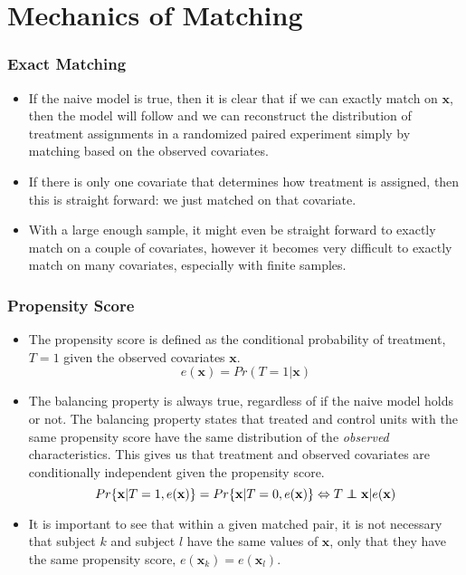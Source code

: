 \documentclass{beamer}
\newcommand\independent{\protect\mathpalette{\protect\independenT}{\perp}}
\def\independenT#1#2{\mathrel{\rlap{$#1#2$}\mkern2mu{#1#2}}}
\begin{document}
\section{Mechanics of Matching} %
\label{sec:mechanics_of_matching}
\begin{frame}[c]\frametitle{Exact Matching}
	\begin{itemize}
		\item<+-> If the naive model is true, then it is clear that if we can exactly match on $\mathbf{x}$, then the model will follow and we can reconstruct the distribution of treatment assignments in a randomized paired experiment simply by matching based on the observed covariates. 
		\item<+-> If there is only one covariate that determines how treatment is assigned, then this is straight forward: we just matched on that covariate.
		\item<+-> With a large enough sample, it might even be straight forward to exactly match on a couple of covariates, however it becomes very difficult to exactly match on many covariates, especially with finite samples.
	\end{itemize}
\end{frame}
\begin{frame}[t]\frametitle{Propensity Score}
	\begin{itemize}
		\item<+->  The propensity score is defined as the conditional probability of treatment, $T = 1$ given the observed covariates $\mathbf{x}$.
		\[ e(\mathbf{x}) = Pr( T = 1 | \mathbf{x}) \] 
		\item<+-> The balancing property is always true, regardless of if the naive model holds or not.  The balancing property states that treated and control units with the same propensity score have the same distribution of the \emph{observed} characteristics.  This gives us that treatment and observed covariates are conditionally independent given the propensity score.
		\[ Pr\{\mathbf{x} | T = 1, e(\mathbf{x})\} = Pr\{\mathbf{x} | T = 0, e(\mathbf{x})\} \Leftrightarrow T \independent \mathbf{x} | e(\mathbf{x}) \]
		\item<+-> It is important to see that within a given matched pair, it is not necessary that subject $k$ and subject $l$ have the same values of $\mathbf{x}$, only that they have the same propensity score, $e(\mathbf{x}_k) = e(\mathbf{x}_l)$. 
	\end{itemize}
\end{frame}
\end{document}
